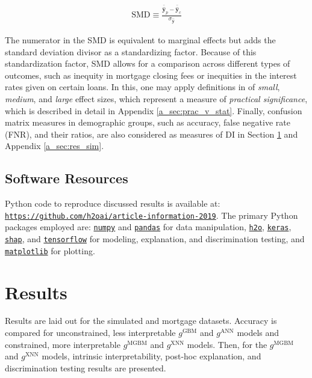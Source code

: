 \documentclass[information,article,submit,moreauthors,pdftex]{definitions/mdpi}
\begin{document}
\begin{equation}
\label{eq:smd}
\begin{aligned}
\text{SMD} \equiv \frac{\bar{\hat{\mathbf{y}}}_p - \bar{\hat{\mathbf{y}}}_c}{ \sigma_{\hat{\mathbf{y}}}}
\end{aligned}
\end{equation}

\noindent The numerator in the SMD is equivalent to marginal effects but adds the standard deviation divisor as a standardizing factor.  Because of this standardization factor, SMD allows for a comparison across different types of outcomes, such as inequity in mortgage closing fees or inequities in the interest rates given on certain loans.  In this, one may apply definitions in \citet{cohen1988statistical} of \textit{small}, \textit{medium}, and \textit{large} effect sizes, which represent a measure of \textit{practical significance}, which is described in detail in Appendix \ref{a_sec:prac_v_stat}. Finally, confusion matrix measures in demographic groups, such as accuracy, false negative rate (FNR), and their ratios, are also considered as measures of DI in Section \ref{sec:res} and Appendix \ref{a_sec:res_sim}.

\subsection{Software Resources}\label{ssec:soft}

Python code to reproduce discussed results is available at: \texttt{\url{https://github.com/h2oai/article-information-2019}}. The primary Python packages employed are: \href{https://numpy.org/}{\texttt{numpy}} and \href{https://pandas.pydata.org/}{\texttt{pandas}} for data manipulation, \href{https://github.com/h2oai/h2o-3}{\texttt{h2o}}, \href{https://keras.io/}{\texttt{keras}}, \href{https://github.com/slundberg/shap}{\texttt{shap}}, and \href{https://www.tensorflow.org/}{\texttt{tensorflow}} for modeling, explanation, and discrimination testing, and \href{https://matplotlib.org/}{\texttt{matplotlib}} for plotting. 

\section{Results}\label{sec:res}

Results are laid out for the simulated and mortgage datasets. Accuracy is compared for unconstrained, less interpretable $g^{\text{GBM}}$ and $g^{\text{ANN}}$ models and constrained, more interpretable $g^{\text{MGBM}}$ and $g^{\text{XNN}}$ models. Then, for the  $g^{\text{MGBM}}$ and $g^{\text{XNN}}$ models, intrinsic interpretability, post-hoc explanation, and discrimination testing results are presented.
\end{document}
